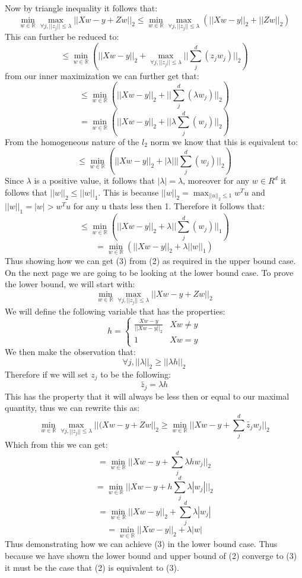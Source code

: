 \documentclass{article}
\begin{document}
\begin{titlepage}
Now by triangle inequality it follows that:
\[ \min_{w \in \mathbb{R}} \max_{\forall j, ||z_j|| \leq \lambda}||Xw - y + Zw ||_2 \leq  \min_{w \in \mathbb{R}} \max_{\forall j, ||z_j|| \leq \lambda} \left(||Xw - y ||_2 + ||Zw ||_2 \right) \]
This can further be reduced to:
\[ \leq  \min_{w \in \mathbb{R}} \left(||Xw - y ||_2 + \max_{\forall j, ||z_j|| \leq \lambda}||\sum_j^d(z_jw_j) ||_2 \right) \]
from our inner maximization we can further get that:
\[ \leq  \min_{w \in \mathbb{R}} \left(||Xw - y ||_2 + ||\sum_j^d(\lambda w_j) ||_2 \right) \]
\[  =  \min_{w \in \mathbb{R}} \left(||Xw - y ||_2 + ||\lambda \sum_j^d(w_j) ||_2 \right) \]
From the homogeneous nature of the $l_2$ norm we know that this is equivalent to:
\[ \leq  \min_{w \in \mathbb{R}} \left(||Xw - y ||_2 + |\lambda|||\sum_j^d(w_j) ||_2 \right) \]
Since $\lambda$ is a positive value, it follows that $|\lambda| = \lambda$, moreover for any $w \in R^d$ it follows that $||w||_2 \leq ||w||_1$. This is because $||w||_2 = \max_{||u||_2 \leq 1}w^Tu$ and $||w||_1 = |w| > w^Tu$ for any u thats less then 1. Therefore it follows that:
\[ \leq  \min_{w \in \mathbb{R}} \left(||Xw - y ||_2 + \lambda||\sum_j^d(w_j) ||_1 \right) \]
\[ =  \min_{w \in \mathbb{R}} \left(||Xw - y ||_2 + \lambda||w||_1 \right) \]
Thus showing how we can get (3) from (2) as required in the upper bound case. On the next page we are going to be looking at the lower bound case.
\newpage
To prove the lower bound, we will start with:
\[ \min_{w \in \mathbb{R}} \max_{\forall j, ||z_j|| \leq \lambda} ||Xw - y + Zw ||_2 \]
We will define the following variable that has the properties:
\[ h = \begin{cases} 
      \frac{Xw-y}{||Xw-y||_2} & Xw \neq y \\
      1 & Xw = y
   \end{cases} \]
We then make the observation that:
\[ \forall j, ||\lambda||_2 \geq ||\lambda h||_2 \]
Therefore if we will set $z_j$ to be the following:
\[ \tilde{z_j} = \lambda h \]
This has the property that it will always be less then or equal to our maximal quantity, thus we can rewrite this as:
\[ \min_{w \in \mathbb{R}} \max_{\forall j, ||z_j|| \leq \lambda} ||(Xw - y + Zw ||_2 \geq \min_{w \in \mathbb{R}} ||Xw - y + \sum_j^d \tilde{z_j}w_j ||_2 \]
Which from this we can get:
\[ = \min_{w \in \mathbb{R}} ||Xw - y + \sum_j^d  \lambda h w_j ||_2 \]
\[ = \min_{w \in \mathbb{R}} ||Xw - y + h\sum_j^d  \lambda |w_j| ||_2 \]
\[ = \min_{w \in \mathbb{R}} ||Xw - y ||_2 + \sum_j^d  \lambda |w_j| \]
\[ = \min_{w \in \mathbb{R}} ||Xw - y ||_2 +  \lambda |w| \]
Thus demonstrating how we can achieve (3) in the lower bound case. Thus because we have shown the lower bound and upper bound of (2) converge to (3) it must be the case that (2) is equivalent to (3).
\end{titlepage}
\end{document}
